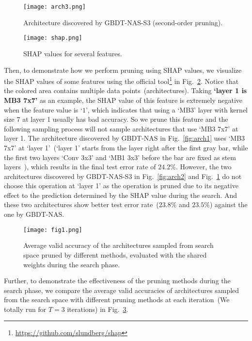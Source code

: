 \documentclass{article}
\begin{document}
\begin{figure}[htbp]
\centering
\texttt{[image: arch3.png]}
\caption{Architecture discovered by GBDT-NAS-S3 (second-order pruning).}
\label{fig:arch3}
\end{figure}

\begin{figure}[htbp]
\centering
\texttt{[image: shap.png]}
\caption{SHAP values for several features.}
\label{fig:shap}
\end{figure}

Then, to demonstrate how we perform pruning using SHAP values, we visualize the SHAP values of some features using the official tool\footnote{\url{https://github.com/slundberg/shap}} in Fig.~\ref{fig:shap}. Notice that the colored area contains multiple data points~(architectures). Taking \textbf{`layer 1 is MB3 7x7'} as an example, the SHAP value of this feature is extremely negative when the feature value is `$1$', which indicates that using a `MB3' layer with kernel size $7$ at layer 1 usually has bad accuracy. So we prune this feature and the following sampling process will not sample architectures that use `MB3 7x7' at layer 1. The architecture discovered by GBDT-NAS in Fig.~\ref{fig:arch1} uses `MB3 7x7' at `layer 1'~(`layer 1' starts from the layer right after the first gray bar, while the first two layers `Conv 3x3' and `MB1 3x3' before the bar are fixed as stem layers~\cite{proxylessnas}), which results in the final test error rate of $24.2\%$. However, the two architectures discovered by GBDT-NAS-S3 in Fig.~\ref{fig:arch2} and Fig.~\ref{fig:arch3} do not choose this operation at `layer 1' as the operation is pruned due to its negative effect to the prediction determined by the SHAP value during the search. And these two architectures show better test error rate~($23.8\%$ and $23.5\%$) against the one by GBDT-NAS.

\begin{figure}[htbp]
\centering
\texttt{[image: fig1.png]}
\caption{Average valid accuracy of the architectures sampled from search space pruned by different methods, evaluated with the shared weights during the search phase.}
\label{fig:acc}
\end{figure}

Further, to demonstrate the effectiveness of the pruning methods during the search phase, we compare the average valid accuracies of architectures sampled from the search space with different pruning methods at each iteration~(We totally run for $T=3$ iterations) in Fig.~\ref{fig:acc}. 
\end{document}

